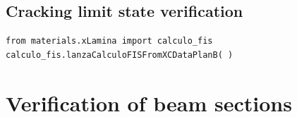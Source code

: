 \subsection{Cracking limit state verification}
\begin{verbatim}
from materials.xLamina import calculo_fis
calculo_fis.lanzaCalculoFISFromXCDataPlanB( )
\end{verbatim}







\section{Verification of beam sections}

